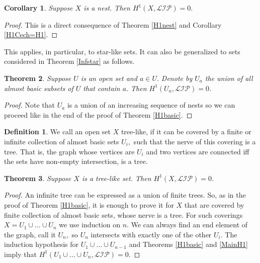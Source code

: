 \documentclass[10pt]{article}
\newtheorem{theorem}{Theorem}
\newtheorem{corollary}[theorem]{Corollary}
\theoremstyle{definition}
\newtheorem{definition}{Definition}
\begin{document}
\begin{corollary} Suppose $X$ is a nest. Then $H^1(X,\mathcal{LIP})=0.$
\end{corollary}

\begin{proof} This is a direct consequence of Theorem \ref{H1nest} and Corollary \ref{H1Cech=H1}.
\end{proof}

This applies, in particular, to star-like sets. It can also be generalized to sets considered  in Theorem \ref{Infstar} as follows.

\begin{theorem} \label{H1Infstar} Suppose $U$ is an open set and $a\in U.$ Denote by $U_a$ the union of all almost basic subsets of $U$ that contain $a.$ Then $H^1(U_a,\mathcal{LIP})=0$.
\end{theorem}

\begin{proof} Note that $U_a$ is a union of an increasing sequence of nests so we can proceed like in the end of the proof of Theorem \ref{H1basic}. 
\end{proof}

\begin{definition} We call an open set $X$ tree-like, if it can be covered by a finite or infinite collection of almost basic sets $U_i,$ such that the nerve of this covering is a tree. That is, the graph whose vertices are $U_i$ and two vertices are connected iff the sets have non-empty intersection, is a tree.
\end{definition}

\begin{theorem} Suppose $X$ is a tree-like set. Then $H^1(X,\mathcal{LIP})=0$.
\end{theorem}

\begin{proof} An infinite tree can be expressed as a union of finite trees. So, as in the proof of Theorem \ref{H1basic}, it is enough to prove it for $X$ that are covered by finite collection of almost basic sets, whose nerve is a tree. For such coverings $X=U_1\cup\dots \cup U_n$ we use induction on $n$. We can always find an end element of the graph, call it $U_n,$ so $U_n$ intersects with exactly one of the other $U_i.$ The induction hypothesis for $U_1\cup\dots \cup U_{n-1}$ and Theorems  \ref{H1basic} and \ref{MainH1} imply that $H^1(U_1\cup\dots \cup U_n, \mathcal{LIP})=0.$
\end{proof}
\end{document}
